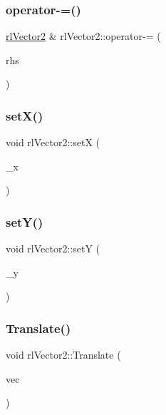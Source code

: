 \mbox{\label{classrl_vector2_aaa3219871659472ddc5824410aaa40e2}} 
\subsubsection{\texorpdfstring{operator-\/=()}{operator-=()}}
{\footnotesize\ttfamily \hyperlink{classrl_vector2}{rl\+Vector2} \& rl\+Vector2\+::operator-\/= (\begin{DoxyParamCaption}\item[{\hyperlink{classrl_vector2}{rl\+Vector2}}]{rhs }\end{DoxyParamCaption})}

\mbox{\label{classrl_vector2_a0f8dfb308f9af458045bf3fafbb4ff91}} 
\subsubsection{\texorpdfstring{set\+X()}{setX()}}
{\footnotesize\ttfamily void rl\+Vector2\+::setX (\begin{DoxyParamCaption}\item[{const float \&}]{\+\_\+x }\end{DoxyParamCaption})}

\mbox{\label{classrl_vector2_a2237e126110f38dae58cd9f94b1dcd0e}} 
\subsubsection{\texorpdfstring{set\+Y()}{setY()}}
{\footnotesize\ttfamily void rl\+Vector2\+::setY (\begin{DoxyParamCaption}\item[{const float \&}]{\+\_\+y }\end{DoxyParamCaption})}

\mbox{\label{classrl_vector2_afa9208eef1c7546011a7ded9840059ff}} 
\subsubsection{\texorpdfstring{Translate()}{Translate()}}
{\footnotesize\ttfamily void rl\+Vector2\+::\+Translate (\begin{DoxyParamCaption}\item[{\hyperlink{classrl_vector2}{rl\+Vector2} \&}]{vec }\end{DoxyParamCaption})}



